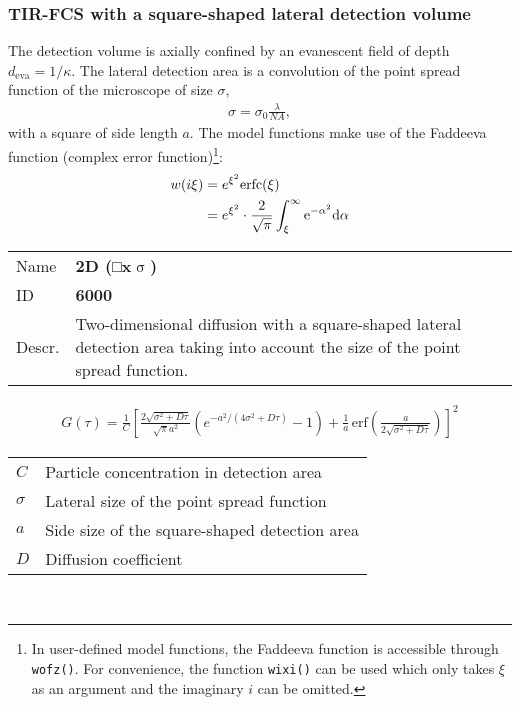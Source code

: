 \subsubsection{TIR-FCS with a square-shaped lateral detection volume}
The detection volume is axially confined by an evanescent field of depth $d_\mathrm{eva} = 1 / \kappa$.
The lateral detection area is a convolution of the point spread function of the microscope of size $\sigma$,
\begin{align}
\sigma = \sigma_0  \frac{\lambda}{\mathit{NA}},
\end{align} 
with a square of side length $a$.
The model functions make use of the Faddeeva function (complex error function)\footnote{In user-defined model functions, the Faddeeva function is accessible through \texttt{wofz()}. For convenience, the function \texttt{wixi()} can be used which only takes $\xi$ as an argument and the imaginary $i$ can be omitted.}:
\begin{align}
w(i\xi) &= e^{\xi^2} \mathrm{erfc}(\xi) \\
\notag &= e^{\xi^2} \cdot  \frac{2}{\sqrt{\pi}} \int_\xi^\infty \mathrm{e}^{-\alpha^2} \mathrm{d\alpha} \label{eq:faddeeva}
\end{align} 
\vspace{2em}


\noindent \begin{tabular}{lp{}}
Name & \textbf{2D (□x$\upsigma$)} \\ 
ID & \textbf{6000} \\ 
Descr. &  Two-dimensional diffusion with a square-shaped lateral detection area taking into account the size of the point spread function. \\ 
\end{tabular}
\begin{align}
G(\tau) = \frac{1}{C} \left[
\frac{2 \sqrt{\sigma^2+D \tau}}{\sqrt{\pi} a^2}
\left( e^{-a^2/(4 \sigma^2+D \tau)} - 1 \right) +
\frac{1}{a} \, \mathrm{erf}\left(\frac{a}{2 \sqrt{\sigma^2+D \tau}}\right)
\right]^2
\end{align} 
\begin{center}
\begin{tabular}{ll}
$C$ & Particle concentration in detection area \\ 
$\sigma$ & Lateral size of the point spread function \\ 
$a$ & Side size of the square-shaped detection area \\
$D$ & Diffusion coefficient \\
\end{tabular} \\
\end{center}
\vspace{2em}